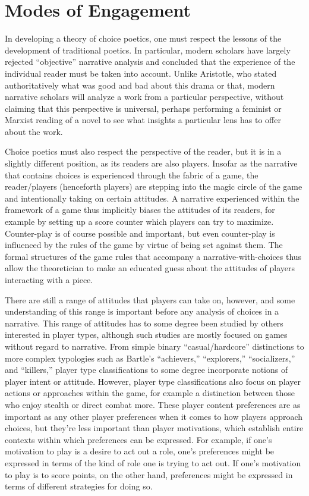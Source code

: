 \section{Modes of Engagement}


In developing a theory of choice poetics, one must respect the lessons of the development of traditional poetics.
%
In particular, modern scholars have largely rejected ``objective'' narrative analysis and concluded that the experience of the individual reader must be taken into account.
%
Unlike Aristotle, who stated authoritatively what was good and bad about this drama or that, modern narrative scholars will analyze a work from a particular perspective, without claiming that this perspective is universal, perhaps performing a feminist or Marxist reading of a novel to see what insights a particular lens has to offer about the work.


Choice poetics must also respect the perspective of the reader, but it is in a slightly different position, as its readers are also players.
%
Insofar as the narrative that contains choices is experienced through the fabric of a game, the reader/players (henceforth players) are stepping into the magic circle of the game \citep{Huizinga1949} and intentionally taking on certain attitudes.
%
A narrative experienced within the framework of a game thus implicitly biases the attitudes of its readers, for example by setting up a score counter which players can try to maximize.
%
Counter-play is of course possible and important, but even counter-play is influenced by the rules of the game by virtue of being set against them.
%
The formal structures of the game rules that accompany a narrative-with-choices thus allow the theoretician to make an educated guess about the attitudes of players interacting with a piece.


There are still a range of attitudes that players can take on, however, and some understanding of this range is important before any analysis of choices in a narrative.
%
This range of attitudes has to some degree been studied by others interested in player types, although such studies are mostly focused on games without regard to narrative.
%
From simple binary ``casual/hardcore'' distinctions to more complex typologies such as Bartle's ``achievers,'' ``explorers,'' ``socializers,'' and ``killers,'' \citep{Bartle1996} player type classifications to some degree incorporate notions of player intent or attitude.
%
However, player type classifications also focus on player actions or approaches within the game, for example a distinction between those who enjoy stealth or direct combat more.
%
These player content preferences are as important as any other player preferences when it comes to how players approach choices, but they're less important than player motivations, which establish entire contexts within which preferences can be expressed.
%
For example, if one's motivation to play is a desire to act out a role, one's preferences might be expressed in terms of the kind of role one is trying to act out.
%
If one's motivation to play is to score points, on the other hand, preferences might be expressed in terms of different strategies for doing so.


